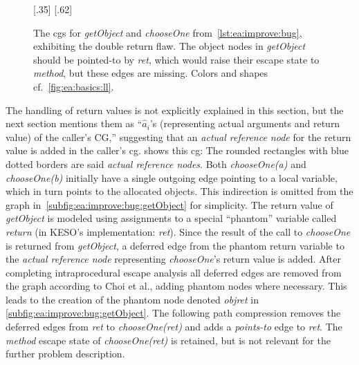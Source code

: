 			\begin{figure}
				\centering%
				{%
						\centering%
				}%
				\hspace{\fill}%
				{%
						\centering%
				}%
				\caption[The \glspl{cg} for \emph{getObject} and \emph{chooseOne} exhibiting the double return flaw]{%
					The \glspl{cg} for \emph{getObject} and \emph{chooseOne} from~\cref{lst:ea:improve:bug}, exhibiting the
					double return flaw. The object nodes in \emph{getObject} should be pointed-to by \emph{ret}, which would
					raise their escape state to \emph{method}, but these edges are missing. Colors and shapes
					cf.~\cref{fig:ea:basics:ll}.}%
				\label{fig:ea:improve:bug}%
			\end{figure}

			The handling of return values is not explicitly explained in this section, but the next section mentions them as
			\enquote{$\hat{a}_i$'s (representing actual arguments and return value) of the caller's CG,}
			\cite[p.~891]{choi:03:toplas} suggesting that an \emph{actual reference node} for the return value is added in the
			caller's \gls{cg}.  shows this \acrlong{cg}: The rounded rectangles with
			blue dotted borders are said \emph{actual reference nodes}. Both \emph{chooseOne(a)} and \emph{chooseOne(b)}
			initially have a single outgoing edge pointing to a local variable, which in turn points to the allocated objects.
			This indirection is omitted from the graph in~\cref{subfig:ea:improve:bug:getObject} for simplicity. The return
			value of \emph{getObject} is modeled using assignments to a special \enquote{phantom} variable called
			\emph{return} (in KESO's implementation: \emph{ret}). Since the result of the call to \emph{chooseOne} is returned
			from \emph{getObject}, a deferred edge from the phantom return variable to the \emph{actual reference node}
			representing \emph{chooseOne}'s return value is added. After completing intraprocedural escape analysis all
			deferred edges are removed from the graph according to Choi et al., adding phantom nodes where necessary. This
			leads to the creation of the phantom node denoted \emph{objret} in \cref{subfig:ea:improve:bug:getObject}. The
			following path compression removes the deferred edges from \emph{ret} to \emph{chooseOne(ret)} and adds
			a \emph{points-to} edge to \emph{ret}. The \emph{method} escape state of \emph{chooseOne(ret)} is retained, but is
			not relevant for the further problem description.

